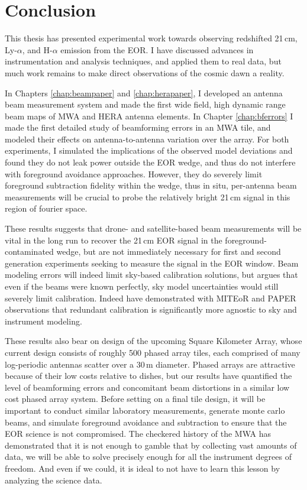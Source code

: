 \chapter{Conclusion}

This thesis has presented experimental work towards observing redshifted 21\,cm, Ly-$\alpha$, and H-$\alpha$ emission from the EOR. I have discussed advances in instrumentation and analysis techniques, and applied them to real data, but much work remains to make direct observations of the cosmic dawn a reality. 
 
In Chapters \ref{chap:beampaper} and \ref{chap:herapaper}, I developed an antenna beam measurement system and made the first wide field, high dynamic range beam maps of MWA and HERA antenna elements. In Chapter \ref{chap:bferrors} I made the first detailed study of beamforming errors in an MWA tile, and modeled their effects on antenna-to-antenna variation over the array. For both experiments, I simulated the implications of the observed model deviations and found they do not leak power outside the EOR wedge, and thus do not interfere with foreground avoidance approaches. However, they do severely limit foreground subtraction fidelity within the wedge, thus in situ, per-antenna beam measurements will be crucial to probe the relatively bright 21\,cm signal in this region of fourier space.

These results suggests that drone- and satellite-based beam measurements will be vital in the long run to recover the 21\,cm EOR signal in the foreground-contaminated wedge, but are not immediately necessary for first and second generation experiments seeking to measure the signal in the EOR window. Beam modeling errors will indeed limit sky-based calibration solutions, but \citet{ewallwice16b} argues that even if the beams were known perfectly, sky model uncertainties would still severely limit calibration. Indeed \citet{zheng14,ali15} have demonstrated with MITEoR and PAPER observations that redundant calibration is significantly more agnostic to sky and instrument modeling.

These results also bear on design of the upcoming Square Kilometer Array, whose current design consists of \citep{aavs,aavs2} roughly 500 phased array tiles, each comprised of many log-periodic antennas scatter over a 30\,m diameter. Phased arrays are attractive because of their low costs relative to dishes, but our results have quantified the level of beamforming errors and concomitant beam distortions in a similar low cost phased array system. Before setting on a final tile design, it will be important to conduct similar laboratory measurements, generate monte carlo beams, and simulate foreground avoidance and subtraction to ensure that the EOR science is not compromised. The checkered history of the MWA has demonstrated that it is not enough to gamble that by collecting vast amounts of data, we will be able to solve precisely enough for all the instrument degrees of freedom. And even if we could, it is ideal to not have to learn this lesson by analyzing the science data.

